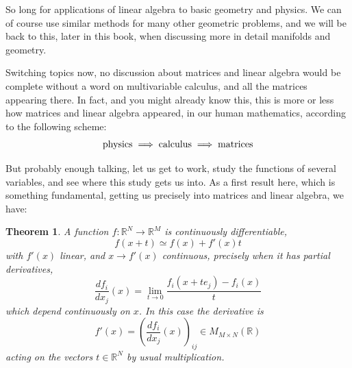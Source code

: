 \documentclass[12pt]{amsbook}
\newtheorem{theorem}{Theorem}[chapter]
\begin{document}
So long for applications of linear algebra to basic geometry and physics. We can of course use similar methods for many other geometric problems, and we will be back to this, later in this book, when discussing more in detail manifolds and geometry.

\bigskip

Switching topics now, no discussion about matrices and linear algebra would be complete without a word on multivariable calculus, and all the matrices appearing there. In fact, and you might already know this, this is more or less how matrices and linear algebra appeared, in our human mathematics, according to the following scheme:
$${\rm physics}\implies{\rm calculus}\implies{\rm matrices}$$

But probably enough talking, let us get to work, study the functions of several variables, and see where this study gets us into. As a first result here, which is something fundamental, getting us precisely into matrices and linear algebra, we have:


\begin{theorem}
A function $f:\mathbb R^N\to\mathbb R^M$ is continuously differentiable,
$$f(x+t)\simeq f(x)+f'(x)t$$
with $f'(x)$ linear, and $x\to f'(x)$ continuous, precisely when it has partial derivatives,
$$\frac{df_i}{dx_j}(x)=\lim_{t\to 0}\frac{f_i(x+te_j)-f_i(x)}{t}$$
which depend continuously on $x$. In this case the derivative is
$$f'(x)=\left(\frac{df_i}{dx_j}(x)\right)_{ij}\in M_{M\times N}(\mathbb R)$$ 
acting on the vectors $t\in\mathbb R^N$ by usual multiplication.
\end{theorem}
\end{document}
